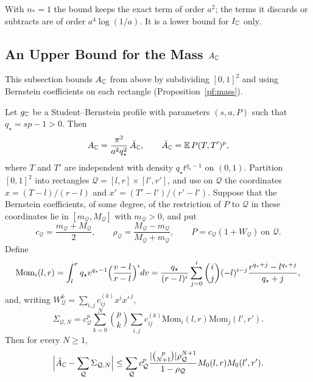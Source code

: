 With $n_*=1$ the bound keeps the exact term of order $a^2$; the terms it
discards or subtracts are of order $a^4\log(1/a)$. It is a lower bound
for $I_\mathbb C$ only.

\subsection{\texorpdfstring{An Upper Bound for the Mass $A_\mathbb C$}{An Upper Bound for the Mass}}

This subsection bounds $A_\mathbb C$ from above by subdividing $[0,1]^2$ and using
Bernstein coefficients on each rectangle (Proposition~\ref{pf:mass}).

\begin{proposition}\label{pf:mass}
Let $g_\mathbb C$ be a Student--Bernstein profile with parameters $(s,a,P)$
such that $q_\star=sp-1>0$. Then
\begin{equation}\label{pf:polynomial-mass}
 A_\mathbb C=\frac{\pi^2}{a^2q_\star^2}\,\bar A_\mathbb C,\qquad
 \bar A_\mathbb C=\mathbb E\,P(T,T')^p,
\end{equation}
where $T$ and $T'$ are independent with density $q_\star t^{q_\star-1}$ on $(0,1)$.
Partition $[0,1]^2$ into rectangles $\mathcal Q=[l,r]\times[l',r']$, and
use on $\mathcal Q$ the coordinates $x=(T-l)/(r-l)$ and
$x'=(T'-l')/(r'-l')$. Suppose that the Bernstein coefficients, of some
degree, of the restriction of $P$ to $\mathcal Q$ in these coordinates
lie in $[m_{\mathcal Q},M_{\mathcal Q}]$ with $m_{\mathcal Q}>0$, and
put
\[
 c_{\mathcal Q}=\frac{m_{\mathcal Q}+M_{\mathcal Q}}2,\qquad
 \rho_{\mathcal Q}=\frac{M_{\mathcal Q}-m_{\mathcal Q}}
 {M_{\mathcal Q}+m_{\mathcal Q}},\qquad
 P=c_{\mathcal Q}(1+W_{\mathcal Q})\ \text{on }\mathcal Q .
\]
Define
\begin{equation}\label{pf:subrectangle-moments}
 \mathrm{Mom}_i(l,r)=\int_l^rq_\star v^{q_\star-1}\Bigl(\frac{v-l}{r-l}\Bigr)^idv
 =\frac{q_\star}{(r-l)^i}\sum_{j=0}^i\binom ij(-l)^{i-j}
 \frac{r^{q_\star+j}-l^{q_\star+j}}{q_\star+j},
\end{equation}
and, writing $W_{\mathcal Q}^k=\sum_{i,j}c^{(k)}_{ij}x^ix'^{\,j}$,
\[
 \Sigma_{\mathcal Q,N}=c_{\mathcal Q}^p\sum_{k=0}^N\binom pk
 \sum_{i,j}c^{(k)}_{ij}\mathrm{Mom}_i(l,r)\mathrm{Mom}_j(l',r').
\]
Then for every $N\ge1$,
\begin{equation}\label{pf:subrectangle-mass}
 \Bigl|\bar A_\mathbb C-\sum_{\mathcal Q}\Sigma_{\mathcal Q,N}\Bigr|
 \le\sum_{\mathcal Q}c_{\mathcal Q}^p
 \frac{|\binom p{N+1}|\rho_{\mathcal Q}^{N+1}}{1-\rho_{\mathcal Q}}
 M_0(l,r)M_0(l',r').
\end{equation}
\end{proposition}


